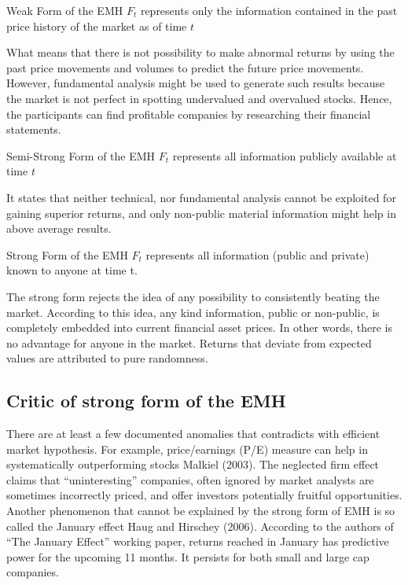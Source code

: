 \documentclass[]{article}
\begin{document}
\theoremstyle{definition}

\begin{definition}{Weak Form of the EMH}
$F_t$ represents only the information contained in the past price history of the market as of time $t$
\end{definition}

What means that there is not possibility to make abnormal returns by
using the past price movements and volumes to predict the future price
movements. However, fundamental analysis might be used to generate such
results because the market is not perfect in spotting undervalued and
overvalued stocks. Hence, the participants can find profitable companies
by researching their financial statements.

\theoremstyle{definition}

\begin{definition}{Semi-Strong Form of the EMH}
$F_t$ represents all information publicly available at time $t$
\end{definition}

It states that neither technical, nor fundamental analysis cannot be
exploited for gaining superior returns, and only non-public material
information might help in above average results.

\theoremstyle{definition}

\begin{definition}{Strong Form of the EMH}
$F_t$ represents all information (public and private) known to anyone at time t.
\end{definition}

The strong form rejects the idea of any possibility to consistently
beating the market. According to this idea, any kind information, public
or non-public, is completely embedded into current financial asset
prices. In other words, there is no advantage for anyone in the market.
Returns that deviate from expected values are attributed to pure
randomness.

\subsection{Critic of strong form of the
EMH}\label{critic-of-strong-form-of-the-emh}

There are at least a few documented anomalies that contradicts with
efficient market hypothesis. For example, price/earnings (P/E) measure
can help in systematically outperforming stocks Malkiel (2003). The
neglected firm effect claims that ``uninteresting'' companies, often
ignored by market analysts are sometimes incorrectly priced, and offer
investors potentially fruitful opportunities. Another phenomenon that
cannot be explained by the strong form of EMH is so called the January
effect Haug and Hirschey (2006). According to the authors of ``The
January Effect'' working paper, returns reached in January has
predictive power for the upcoming 11 months. It persists for both small
and large cap companies.
\end{document}
